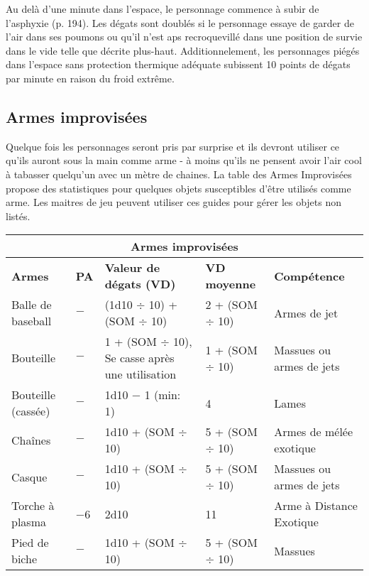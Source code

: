 Au delà d'une minute dans l'espace, le personnage commence à subir de l'asphyxie (p. 194). Les dégats sont doublés si le personnage essaye de garder de l'air dans ses poumons ou qu'il n'est aps recroquevillé dans une position de survie dans le vide telle que décrite plus-haut. Additionnelement, les personnages piégés dans l'espace sans protection thermique adéquate subissent 10 points de dégats par minute en raison du froid extrême. 

\subsection{Armes improvisées} \label{sec:improvised-weapons} 

Quelque fois les personnages seront pris par surprise et ils devront utiliser ce qu'ils auront sous la main comme arme - à moins qu'ils ne pensent avoir l'air cool à tabasser quelqu'un avec un mètre de chaines. La table des Armes Improvisées propose des statistiques pour quelques objets susceptibles d'être utilisés comme arme. Les maitres de jeu peuvent utiliser ces guides pour gérer les objets non listés. 

\begin{table} \begin{tabularx}{\textwidth}{|l|l|l|l|X|} \hline

\multicolumn{5}{|c|}{\textbf{Armes improvisées}} \\ \hline

\textbf{Armes}	&\textbf{PA}	&\textbf{Valeur de dégats (VD)}	&\textbf{VD moyenne}	&\textbf{Compétence}	\\ \hline

Balle de baseball	&$-$	&(1d10 $\div$ 10) + (SOM $\div$ 10)	&2 + (SOM $\div$ 10)	&Armes de jet	\\ \hline

Bouteille	&$-$	&1 + (SOM $\div$ 10), Se casse après une utilisation	&1 + (SOM $\div$ 10)	&Massues ou armes de jets	\\ \hline

Bouteille (cassée)	&$-$	&1d10 $-$ 1 (min: 1)	&4	&Lames	\\ \hline

Chaînes	&$-$	&1d10 + (SOM $\div$ 10)	&5 + (SOM $\div$ 10)	&Armes de mélée exotique\\ \hline

Casque	&$-$	&1d10 + (SOM $\div$ 10)	&5 + (SOM $\div$ 10)	&Massues ou armes de jets	\\ \hline

Torche à plasma	&$-$6	&2d10	&11	&Arme à Distance Exotique \\ \hline

Pied de biche	&$-$ &1d10 + (SOM $\div$ 10)	&5 + (SOM $\div$ 10)	&Massues	\\ \hline

\end{tabularx} \label{tab:improvised-weapons} \end{table} 



